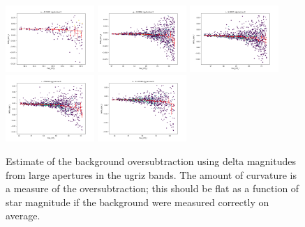 \begin{figure}
  \begin{center}
    \includegraphics[width=0.3\textwidth]{photometric_calibration_figures/background_oversubtraction_u.png}
    \includegraphics[width=0.3\textwidth]{photometric_calibration_figures/background_oversubtraction_g.png}
    \includegraphics[width=0.3\textwidth]{photometric_calibration_figures/background_oversubtraction_r.png}
    \includegraphics[width=0.3\textwidth]{photometric_calibration_figures/background_oversubtraction_i.png}
    \includegraphics[width=0.3\textwidth]{photometric_calibration_figures/background_oversubtraction_z.png}
  \end{center}
  \caption{Estimate of the background oversubtraction using delta magnitudes
    from large apertures in the ugriz bands.  The amount of curvature is a measure
    of the oversubtraction; this should be flat as a function of star magnitude
    if the background were measured correctly on average.}
\end{figure}

